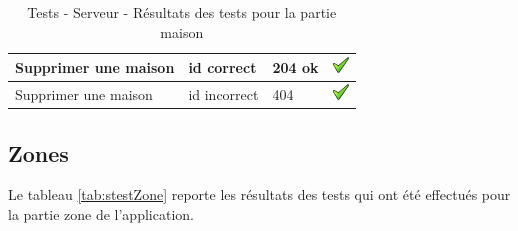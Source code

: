 \begin{table}[H]
\begin{tabularx}{\textwidth}{|X|X|X|X|}
  \hline
  Supprimer une maison & id correct & 204 ok & \includegraphics[width=16px]{00_media/ok.png} \\
  \hline
   Supprimer une maison & id incorrect & 404 & \includegraphics[width=16px]{00_media/ok.png} \\
  \hline
\end{tabularx}
\caption{Tests - Serveur - Résultats des tests pour la partie maison}
\label{tab:stestMaison}
\end{table}

\clearpage

\subsection{Zones} %
\label{sub:login}
Le tableau \ref{tab:stestZone} reporte les résultats des tests qui ont été effectués pour la partie zone de l'application.

